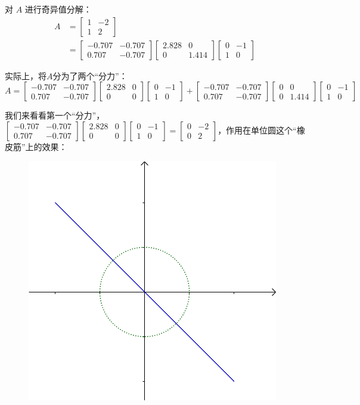 \documentclass[12pt]{article}
\begin{document}
对 $A$ 进行奇异值分解：
\begin{align*}
    A &= \begin{bmatrix}1&-2\\1&2\end{bmatrix} \\
    &= \begin{bmatrix}-0.707&-0.707\\0.707&-0.707\end{bmatrix} 
    \begin{bmatrix}2.828&0\\0&1.414\end{bmatrix}
    \begin{bmatrix}0&-1\\1&0\end{bmatrix}
\end{align*}

实际上，将$A$分为了两个“分力”：
$$
 A  = \begin{bmatrix}-0.707&-0.707\\0.707&-0.707\end{bmatrix} 
    \begin{bmatrix}2.828&0\\0&0\end{bmatrix}
    \begin{bmatrix}0&-1\\1&0\end{bmatrix} + 
    \begin{bmatrix}-0.707&-0.707\\0.707&-0.707\end{bmatrix} 
    \begin{bmatrix}0&0\\0&1.414\end{bmatrix}
    \begin{bmatrix}0&-1\\1&0\end{bmatrix}
$$

我们来看看第一个“分力”，$\begin{bmatrix}-0.707&-0.707\\0.707&-0.707\end{bmatrix}\begin{bmatrix}2.828&0\\0&0\end{bmatrix}\begin{bmatrix}0&-1\\1&0\end{bmatrix}=\begin{bmatrix}0&-2\\0&2\end{bmatrix}$，作用在单位圆这个“橡皮筋”上的效果：
\begin{figure}[H]
    \centering
    \includegraphics[width=.3\textwidth]{fig/UnderstandSingularValue_3.png}
\end{figure} 
\end{document}
